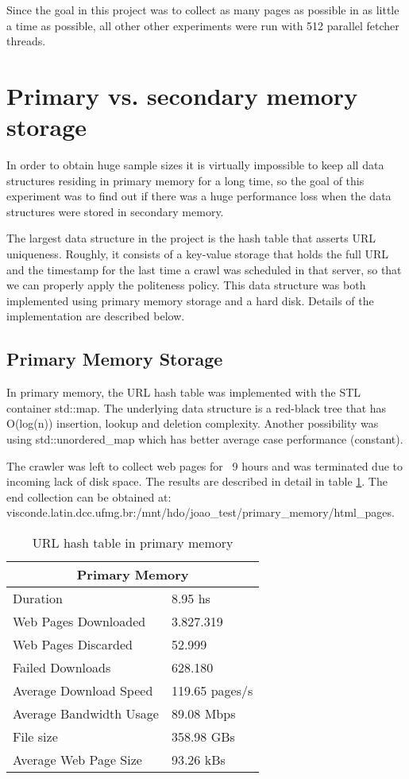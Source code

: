 \documentclass{report}
\begin{document}
Since the goal in this project was to collect as many pages as possible in as little a time as possible, all other
other experiments were run with 512 parallel fetcher threads.

\section{Primary vs. secondary memory storage}
In order to obtain huge sample sizes it is virtually impossible to keep all data structures residing in 
primary memory for a long time, so the goal of this experiment was to find out if there was a huge performance loss 
when the data structures were stored in secondary memory.

The largest data structure in the project is the hash table that asserts URL uniqueness. Roughly, it consists
of a key-value storage that holds the full URL and the timestamp for the last time a crawl was scheduled in that
server, so that we can properly apply the politeness policy. This data structure was both implemented using primary
memory storage and a hard disk. Details of the implementation are described below.

\subsection{Primary Memory Storage}

In primary memory, the URL hash table was implemented with the STL container std::map. The underlying data structure is a
red-black tree that has O(log(n)) insertion, lookup and deletion complexity. Another possibility was using std::unordered\_map
which has better average case performance (constant).

The crawler was left to collect web pages for ~9 hours and was terminated due to incoming lack of disk space. The results are described
in detail in table \ref{tab:primarymemory}. The end collection can be obtained at: \\
visconde.latin.dcc.ufmg.br:/mnt/hdo/joao\_test/primary\_memory/html\_pages.

\begin{table}
\centering
\begin{tabular}{ |l|l| }
  \hline
  \multicolumn{2}{|c|}{Primary Memory} \\
  \hline
  Duration & 8.95 hs \\
  Web Pages Downloaded & 3.827.319 \\
  Web Pages Discarded & 52.999 \\
  Failed Downloads & 628.180 \\
  Average Download Speed & 119.65 pages/s \\
  Average Bandwidth Usage & 89.08 Mbps \\
  File size & 358.98 GBs \\
  Average Web Page Size & 93.26 kBs \\
  \hline
\end{tabular}
\caption{URL hash table in primary memory}
\label{tab:primarymemory}
\end{table}
\end{document}
